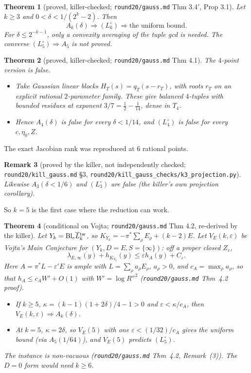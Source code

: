 \documentclass[11pt]{article}
\newtheorem{theorem}{Theorem}[section]
\newtheorem{remark}[theorem]{Remark}
\newcommand{\Ltw}[1]{\overline L{}^{\rm tw}_{#1}}
\newcommand{\rec}[1]{\texttt{#1}}
\begin{document}
\begin{theorem}[proved, killer-checked; \rec{round20/gauss.md} Thm 3.4\('\), Prop 3.1]\label{thm:reduction}
Let \(k\ge3\) and \(0<\delta<1/(2^k-2)\).  Then
\[
  A_k(\delta)\Rightarrow(L_k^\circ)\Rightarrow\text{the uniform bound}.
\]
For \(\delta\le2^{-k-1}\), only a convexity averaging of the tuple gcd is
needed.  The converse \((L_5^\circ)\Rightarrow A_5\) is \emph{not} proved.
\end{theorem}

\begin{theorem}[proved, killer-checked; \rec{round20/gauss.md} Thm 4.1]\label{thm:k4false}
The \(4\)-point version is false.
\begin{itemize}
  \item Take Gaussian linear blocks \(H_T(s)=q_T(s-r_T)\), with roots \(r_T\) on
    an explicit rational \(2\)-parameter family.  These give balanced
    \(4\)-tuples with bounded residues at exponent
    \(3/7=\frac12-\frac1{14}\), dense in \(T_4\).
  \item Hence \(A_4(\delta)\) is false for every \(\delta<1/14\), and
    \((L_4^\circ)\) is false for every \(c,\eta_0,Z\).
\end{itemize}
\end{theorem}

The exact Jacobian rank was reproduced at \(6\) rational points.

\begin{remark}[proved by the killer, not independently checked; \rec{round20/kill\_gauss.md} \S3, \rec{round20/kill\_gauss\_checks/k3\_projection.py}]\label{rem:k3false}
Likewise \(A_3(\delta<1/6)\) and \((L_3^\circ)\) are false (the killer's own
projection corollary).
\end{remark}

So \(k=5\) is the first case where the reduction can work.

\begin{theorem}[conditional on Vojta; \rec{round20/gauss.md} Thm 4.2, re-derived by the killer]\label{thm:VE}
Let \(Y_k=\mathrm{Bl}_e\Ltw k\), so \(K_{Y_k}=-\pi^*\sum_\rho E_\rho+(k-2)E\).
Let \(V_E(k,\varepsilon)\) be Vojta's Main Conjecture for
\((Y_k,D=E,S=\{\infty\})\): off a proper closed \(Z_\varepsilon\),
\[
  \lambda_{E,\infty}(y)+h_{K_{Y_k}}(y)\le\varepsilon h_A(y)+C_\varepsilon .
\]
Here \(A=\pi^*L-\varepsilon'E\) is ample with \(L=\sum_\rho a_\rho E_\rho\),
\(a_\rho>0\), and \(c_A=\max_\rho a_\rho\), so that \(h_A\le c_AW'+O(1)\) with
\(W'=\log R''^2\) (\rec{round20/gauss.md} Thm~4.2 proof).
\begin{itemize}
  \item If \(k\ge5\), \(\kappa=(k-1)(1+2\delta)/4-1>0\) and
    \(\varepsilon<\kappa/c_A\), then \(V_E(k,\varepsilon)\Rightarrow A_k(\delta)\).
  \item At \(k=5\), \(\kappa=2\delta\), so \(V_E(5)\) with one
    \(\varepsilon<(1/32)/c_A\) gives the uniform bound (via \(A_5(1/64)\)),
    and \(V_E(5)\) predicts \((L_5^\circ)\).
\end{itemize}
The instance is non-vacuous (\rec{round20/gauss.md} Thm~4.2, Remark~(3)).  The
\(D=0\) form would need \(k\ge6\).
\end{theorem}
\end{document}
